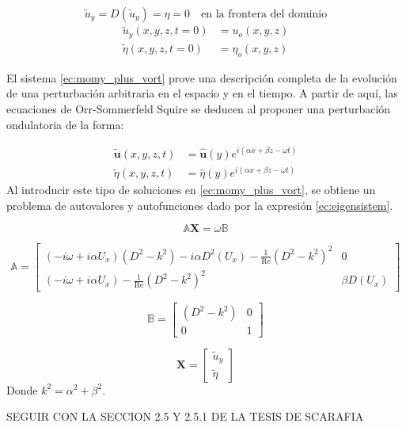 \begin{equation}
\tilde{u}_y = D(\tilde{u}_y) = \eta = 0 \quad \text{en la frontera del dominio}  
\label{ec:bc_orr_som}
\end{equation}
\begin{align}
\tilde{u}_y (x,y,z, t=0) &= u_o(x,y,z) \\
\tilde{\eta} (x,y,z, t=0) &= \eta_o(x,y,z)   
\label{ec:init_orr_som}
\end{align}

El sistema \ref{ec:momy_plus_vort} prove una descripción completa de la evolución de una
perturbación arbitraria en el espacio y en el tiempo. A partir de aquí, las ecuaciones de Orr-Sommerfeld Squire se deducen al  proponer una perturbación ondulatoria de la forma:

\begin{align}
\tilde{\mathbf{u}} (x,y,z,t) &= \hat{\mathbf{u}}(y) e^{ i (\alpha x + \beta z - \omega t)} \\
\tilde{\eta} (x,y,z,t) &= \hat{\eta}(y) e^{ i (\alpha x + \beta z - \omega t)}   
\label{ec:armonic_orr_som_sol}
\end{align}
Al introducir este tipo de soluciones en \ref{ec:momy_plus_vort}, se obtiene un problema de autovalores y
autofunciones dado por la expresión \ref{ec:eigensistem}.

\begin{equation}
\mathbb{A} \mathbf{X} = \omega \mathbb{B}
\label{ec:eigensistem}
\end{equation}


\begin{equation*}
\mathbb{A} = 
\begin{bmatrix}
(- i \omega + i \alpha U_x) (D^2 - k^2) - i \alpha D^2(U_x) - \frac{1}{\text{Re}} (D^2 - k^2)^2  & 0 \\
(- i \omega + i \alpha U_x) - \frac{1}{\text{Re}} (D^2 - k^2)^2  & \beta D(U_x) 
\end{bmatrix}
\end{equation*}

\begin{equation*}
\mathbb{B} = 
\begin{bmatrix}
(D^2 - k^2)  & 0 \\
0  & 1 
\end{bmatrix}
\end{equation*}

\begin{equation*}
\mathbf{X} = 
\begin{bmatrix}
\tilde{u}_y \\ \tilde{\eta}
\end{bmatrix}
\end{equation*}
Donde $k^2 = \alpha^2 + \beta^2$.

SEGUIR CON LA SECCION 2.5 Y 2.5.1 DE LA TESIS DE SCARAFIA